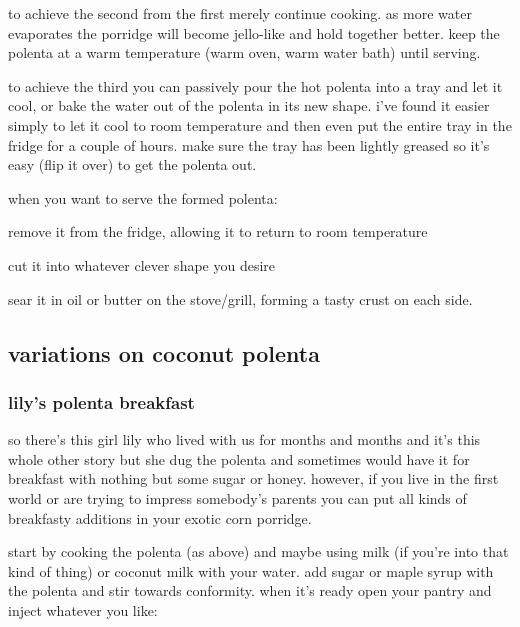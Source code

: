 to achieve the second from the first merely continue cooking. as more water 
evaporates the porridge will become jello-like and hold together better. keep 
the polenta at a warm temperature (warm oven, warm water bath) until serving.

to achieve the third you can passively pour the hot polenta into a tray and 
let it cool, or bake the water out of the polenta in its new shape. i've found 
it easier simply to let it cool to room temperature and then even put the 
entire tray in the fridge for a couple of hours. make sure the tray has been 
lightly greased so it's easy (flip it over) to get the polenta out. 

when you want to serve the formed polenta:

\begin{ingredients}

  \item remove it from the fridge, allowing it to return to room temperature

  \item cut it into whatever clever shape you desire

  \item sear it in oil or butter on the stove/grill, forming a tasty crust on 
  each side.

\end{ingredients}

\subsection{variations on coconut polenta}

\subsubsection{lily's polenta breakfast}

so there's this girl lily who lived with us for months and months and it's 
this whole other story but she dug the polenta and sometimes would have it 
for breakfast with nothing but some sugar or honey. however, if you live in 
the first world or are trying to impress somebody's parents you can put all 
kinds of breakfasty additions in your exotic corn porridge.

start by cooking the polenta (as above) and maybe using milk (if you're into 
that kind of thing) or coconut milk with your water. add sugar or maple 
syrup with the polenta and stir towards conformity. when it's ready open your 
pantry and inject whatever you like:

